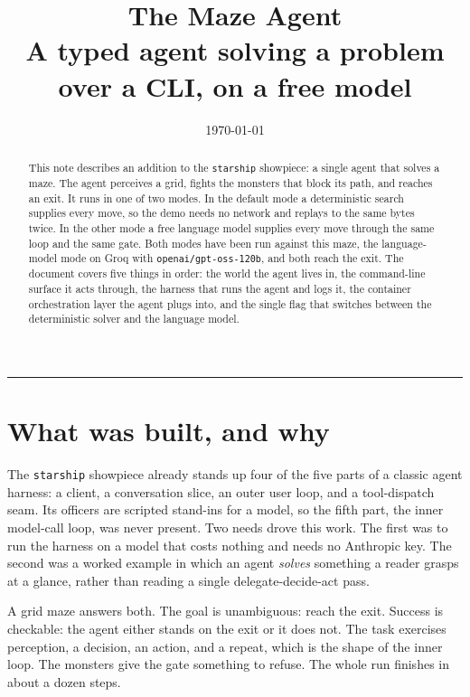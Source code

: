\documentclass[11pt]{article}
\title{\textbf{The Maze Agent}\\[4pt]
  \large A typed agent solving a problem over a CLI, on a free model}
\author{}
\date{\today}
\newcommand{\code}[1]{\texttt{#1}}
\begin{document}
\maketitle
\thispagestyle{empty}

\begin{abstract}
\noindent This note describes an addition to the \code{starship} showpiece: a
single agent that solves a maze. The agent perceives a grid, fights the monsters
that block its path, and reaches an exit. It runs in one of two modes. In the
default mode a deterministic search supplies every move, so the demo needs no
network and replays to the same bytes twice. In the other mode a free language
model supplies every move through the same loop and the same gate. Both modes
have been run against this maze, the language-model mode on Groq with
\code{openai/gpt-oss-120b}, and both reach the exit. The document
covers five things in order: the world the agent lives in, the command-line
surface it acts through, the harness that runs the agent and logs it, the
container orchestration layer the agent plugs into, and the single flag that
switches between the deterministic solver and the language model.
\end{abstract}

\tableofcontents
\bigskip
\hrule
\bigskip

\section{What was built, and why}

The \code{starship} showpiece already stands up four of the five parts of a
classic agent harness: a client, a conversation slice, an outer user loop, and a
tool-dispatch seam. Its officers are scripted stand-ins for a model, so the fifth
part, the inner model-call loop, was never present. Two needs drove this work.
The first was to run the harness on a model that costs nothing and needs no
Anthropic key. The second was a worked example in which an agent \emph{solves}
something a reader grasps at a glance, rather than reading a single
delegate-decide-act pass.

A grid maze answers both. The goal is unambiguous: reach the exit. Success is
checkable: the agent either stands on the exit or it does not. The task exercises
perception, a decision, an action, and a repeat, which is the shape of the inner
loop. The monsters give the gate something to refuse. The whole run finishes in
about a dozen steps.
\end{document}
